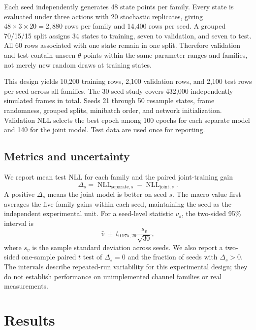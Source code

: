 \documentclass[10pt]{article}
\begin{document}
Each seed independently generates 48 state points per family. Every state is evaluated under three actions with 20 stochastic replicates, giving $48\times3\times20=2{,}880$ rows per family and 14,400 rows per seed. A grouped 70/15/15 split assigns 34 states to training, seven to validation, and seven to test. All 60 rows associated with one state remain in one split. Therefore validation and test contain unseen $\theta$ points within the same parameter ranges and families, not merely new random draws at training states.

This design yields 10,200 training rows, 2,100 validation rows, and 2,100 test rows per seed across all families. The 30-seed study covers 432,000 independently simulated frames in total. Seeds 21 through 50 resample states, frame randomness, grouped splits, minibatch order, and network initialization. Validation NLL selects the best epoch among 100 epochs for each separate model and 140 for the joint model. Test data are used once for reporting.

\subsection{Metrics and uncertainty}

We report mean test NLL for each family and the paired joint-training gain
\begin{equation}
  \Delta_s=\operatorname{NLL}_{\mathrm{separate},s}
  -\operatorname{NLL}_{\mathrm{joint},s}.
  \label{eq:gain}
\end{equation}
A positive $\Delta_s$ means the joint model is better on seed $s$. The macro value first averages the five family gains within each seed, maintaining the seed as the independent experimental unit. For a seed-level statistic $v_s$, the two-sided 95\% interval is
\begin{equation}
 \bar v \ \mathbin{\pm}\ t_{0.975,29}\frac{s_v}{\sqrt{30}},
 \label{eq:ci}
\end{equation}
where $s_v$ is the sample standard deviation across seeds. We also report a two-sided one-sample paired $t$ test of $\Delta_s=0$ and the fraction of seeds with $\Delta_s>0$. The intervals describe repeated-run variability for this experimental design; they do not establish performance on unimplemented channel families or real measurements.

\section{Results}
\end{document}
